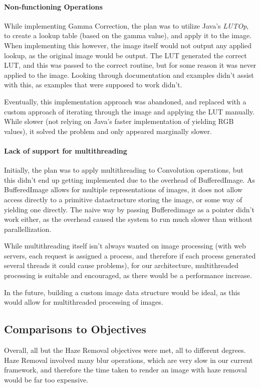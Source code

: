 \documentclass[10pt,a4paper]{article}
\begin{document}
\paragraph{Non-functioning Operations}
While implementing Gamma Correction, the plan was to utilize Java's \emph{LUTOp}, to create a lookup table (based on the gamma value),
and apply it to the image. When implementing this however, the image itself would not output any applied lookup, as the original image would be output.
The LUT generated the correct LUT, and this was passed to the correct routine, but for some reason it was never applied to the image. Looking through
documentation and examples didn't assist with this, as examples that were supposed to work didn't.

Eventually, this implementation approach was abandoned, and replaced with a custom approach of iterating through the image and applying the LUT
manually. While slower (not relying on Java's faster implementation of yielding RGB values), it solved the problem and only appeared marginally slower.

\paragraph{Lack of support for multithreading}
Initially, the plan was to apply multithreading to Convolution operations, but this didn't end up getting implemented due to the overhead of BufferedImage.
As BufferedImage allows for multiple representations of images, it does not allow access directly to a primitive datastructure storing the image, or some way of
yielding one directly. The naive way by passing Bufferedimage as a pointer didn't work either, as the overhead caused the system to run much slower than without parallellization.

While multithreading itself isn't always wanted on image processing (with web servers, each request is assigned a process, and therefore if each process generated several threads it could
cause problems), for our architecture, multithreaded processing is suitable and encouraged, as there would be a performance increase.

In the future, building a custom image data structure would be ideal, as this would allow for multithreaded processing of images.

\subsection{Comparisons to Objectives}
Overall, all but the Haze Removal objectives were met, all to different degrees. Haze Removal involved many blur operations, which are very slow in our current framework, and therefore the
time taken to render an image with haze removal would be far too expensive. 
\end{document}
